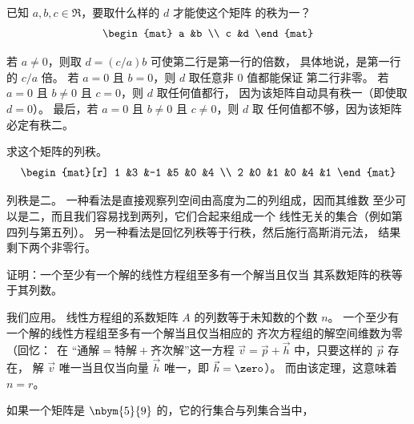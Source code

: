   \recommended \item
    已知 \( a,b,c\in\Re \)，要取什么样的 \( d \) 才能使这个矩阵
    的秩为一？
    \begin{equation*}
      \begin{mat}
         a  &b  \\
         c  &d
      \end{mat}
    \end{equation*}
    \begin{answer}
      若 \( a\neq 0 \)，则取 \( d=(c/a)b \) 可使第二行是第一行的倍数，
      具体地说，是第一行的 \( c/a \) 倍。
      若 \( a=0 \) 且 \( b=0 \)，则 \( d \) 取任意非 \( 0 \) 值都能保证
      第二行非零。
      若 \( a=0 \) 且 \( b\neq 0 \) 且 \( c=0 \)，则 \( d \) 取任何值都行，
      因为该矩阵自动具有秩一（即使取 $d=0$）。
      最后，若 \( a=0 \) 且 \( b\neq 0 \) 且 \( c\neq 0 \)，则 \( d \) 取
      任何值都不够，因为该矩阵必定有秩二。
    \end{answer}
  \item
    求这个矩阵的列秩。
    \begin{equation*}
      \begin{mat}[r]
        1  &3  &-1  &5  &0  &4  \\
        2  &0  &1   &0  &4  &1
      \end{mat}
    \end{equation*}
    \begin{answer}
      列秩是二。
      一种看法是直接观察\Dash 列空间由高度为二的列组成，因而其维数
      至少可以是二，而且我们容易找到两列，它们合起来组成一个
      线性无关的集合（例如第四列与第五列）。
      另一种看法是回忆列秩等于行秩，然后施行高斯消元法，
      结果剩下两个非零行。
    \end{answer}
  \item
    证明：一个至少有一个解的线性方程组至多有一个解当且仅当
    其系数矩阵的秩等于其列数。
    \begin{answer}
      我们应用。
      线性方程组的系数矩阵 $A$ 的列数等于未知数的个数 $n$。
      一个至少有一个解的线性方程组至多有一个解当且仅当相应的
      齐次方程组的解空间维数为零（回忆：~在
      “$\text{通解}=\text{特解}+\text{齐次解}$”这一方程
       $\vec{v}=\vec{p}+\vec{h}$ 中，只要这样的 $\vec{p}$ 存在，
       解 $\vec{v}$ 唯一当且仅当向量 $\vec{h}$ 唯一，即 $\vec{h}=\zero$）。
       而由该定理，这意味着 $n=r$。
    \end{answer}
  \recommended \item
    如果一个矩阵是 \( \nbym{5}{9} \) 的，它的行集合与列集合当中，
